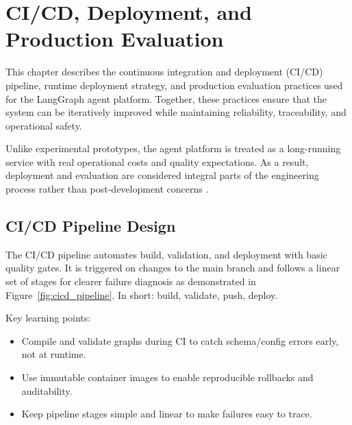 \chapter{CI/CD, Deployment, and Production Evaluation}
\label{ch:CICDDeployment}

This chapter describes the continuous integration and deployment (CI/CD)
pipeline, runtime deployment strategy, and production evaluation practices
used for the LangGraph agent platform. Together, these practices ensure that
the system can be iteratively improved while maintaining reliability,
traceability, and operational safety.

Unlike experimental prototypes, the agent platform is treated as a
long-running service with real operational costs and quality expectations.
As a result, deployment and evaluation are considered integral parts of the
engineering process rather than post-development concerns
\cite{googleSRE,microsoftWellArchitected}.

\section{CI/CD Pipeline Design}
\label{sec:CICDPipeline}

The CI/CD pipeline automates build, validation, and deployment with basic quality
gates. It is triggered on changes to the main branch and follows a linear set of
stages for clearer failure diagnosis as demonstrated in Figure~\ref{fig:cicd_pipeline}. In short: build, validate, push, deploy.

Key learning points:
\begin{itemize}
      \item Compile and validate graphs during CI to catch schema/config errors early, not at runtime.
      \item Use immutable container images to enable reproducible rollbacks and auditability.
      \item Keep pipeline stages simple and linear to make failures easy to trace.
\end{itemize}

